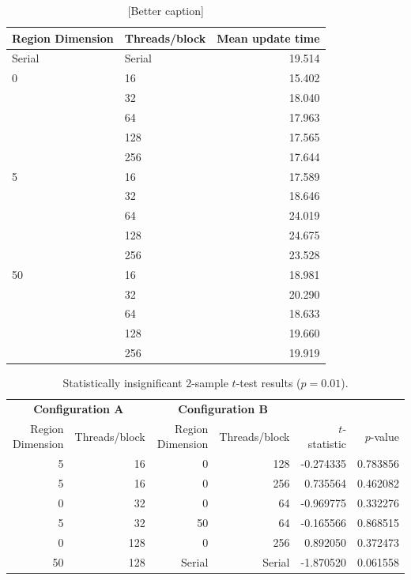 \documentclass[onecolumn,12pt]{IEEEtran}
\begin{document}
\begin{table}
    \centering
    \caption{[Better caption]}
    \begin{tabular}{llr}
        \toprule
        \textbf{Region Dimension} & \textbf{Threads/block} & \textbf{Mean
        update time} \\ \midrule
        Serial  & Serial   &  19.514 \\
        0  & 16  &  15.402 \\
        & 32  &  18.040 \\
        & 64  &  17.963 \\
        & 128 &  17.565 \\
        & 256 &  17.644 \\ \midrule
        5  & 16  &  17.589 \\
        & 32  &  18.646 \\
        & 64  &  24.019 \\
        & 128 &  24.675 \\
        & 256 &  23.528 \\ \midrule
        50 & 16  &  18.981 \\
        & 32  &  20.290 \\
        & 64  &  18.633 \\
        & 128 &  19.660 \\
        & 256 & 19.919 \\ \bottomrule
    \end{tabular}
    \label{tab:means}
\end{table}

\begin{table}
    \centering
    \caption{Statistically insignificant 2-sample $t$-test results ($p = 0.01$).}
    \begin{tabular}{rrrrrr} \toprule
        \multicolumn{2}{c}{\textbf{Configuration A}} &
        \multicolumn{2}{c}{\textbf{Configuration B}}
        \\
        Region Dimension & Threads/block &  Region Dimension & Threads/block &
        $t$-statistic & $p$-value \\ \midrule
        5  & 16  &      0 &   128  & -0.274335 & 0.783856 \\
        5  & 16  &      0 &   256  &  0.735564 & 0.462082 \\
        0  & 32  &      0 &    64  & -0.969775 & 0.332276 \\
        5  & 32  &     50 &    64  & -0.165566 & 0.868515 \\
        0  & 128 &      0 &   256  &  0.892050 & 0.372473 \\
        50 & 128 & Serial & Serial & -1.870520 & 0.061558 \\ \bottomrule
    \end{tabular}
    \label{tab:stats}
\end{table}
\end{document}
